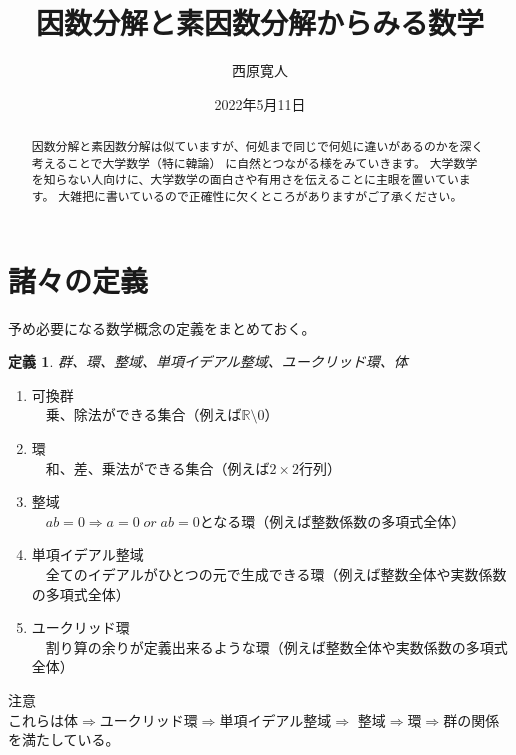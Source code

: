\documentclass{jsarticle}
\title{因数分解と素因数分解からみる数学}
\author{西原寛人}
\date{2022年5月11日}
\newtheorem{definition}{定義}
\begin{document}
\maketitle
\begin{abstract}
    因数分解と素因数分解は似ていますが、何処まで同じで何処に違いがあるのかを深く考えることで大学数学（特に韓論）
    に自然とつながる様をみていきます。
    大学数学を知らない人向けに、大学数学の面白さや有用さを伝えることに主眼を置いています。
    大雑把に書いているので正確性に欠くところがありますがご了承ください。
\end{abstract}
\section{諸々の定義}
予め必要になる数学概念の定義をまとめておく。
\begin{definition}
    群、環、整域、単項イデアル整域、ユークリッド環、体
\end{definition}
\begin{enumerate}
    \item 可換群\\　乗、除法ができる集合（例えば$\mathbb{R}\setminus{0}$）
    \item 環\\　和、差、乗法ができる集合（例えば$2\times 2$行列）
    \item 整域\\　$ab=0\Rightarrow a=0 \;or\;a b=0$となる環（例えば整数係数の多項式全体）
    \item 単項イデアル整域\\　全てのイデアルがひとつの元で生成できる環（例えば整数全体や実数係数の多項式全体）
    \item ユークリッド環\\　割り算の余りが定義出来るような環（例えば整数全体や実数係数の多項式全体）
\end{enumerate}
注意\\
これらは体$\Rightarrow$ユークリッド環$\Rightarrow$単項イデアル整域$\Rightarrow$
整域$\Rightarrow$環$\Rightarrow$群の関係を満たしている。
\end{document}
